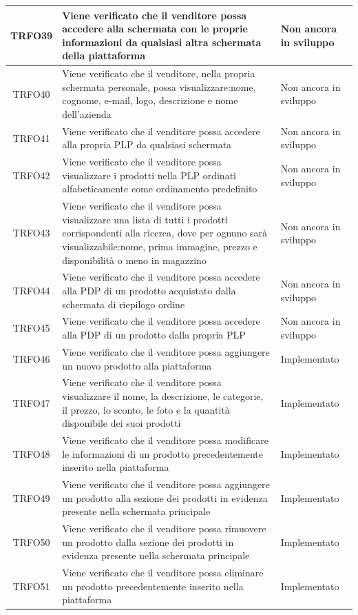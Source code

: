 \begin{longtable}{|c| C{10cm} |C{3cm}|}
	TRFO39 & Viene verificato che il venditore possa accedere alla schermata con le proprie informazioni da qualsiasi altra schermata della piattaforma & Non ancora in sviluppo\\ \hline
	TRFO40 & Viene verificato che il venditore, nella propria schermata personale, possa visualizzare:nome, cognome, e-mail, logo, descrizione e nome dell'azienda & Non ancora in sviluppo\\ \hline
	TRFO41 & Viene verificato che il venditore possa accedere alla propria PLP da qualsiasi schermata & Non ancora in sviluppo\\ \hline
	TRFO42 & Viene verificato che il venditore possa visualizzare i prodotti nella PLP ordinati alfabeticamente come ordinamento predefinito & Non ancora in sviluppo\\ \hline
	TRFO43 & Viene verificato che il venditore possa visualizzare una lista di tutti i prodotti corrispondenti alla ricerca, dove per ognuno sarà visualizzabile:nome, prima immagine, prezzo e disponibilità o meno in magazzino & Non ancora in sviluppo\\ \hline
	TRFO44 & Viene verificato che il venditore possa accedere alla PDP di un prodotto acquistato dalla schermata di riepilogo ordine & Non ancora in sviluppo\\ \hline
	TRFO45 & Viene verificato che il venditore possa accedere alla PDP di un prodotto dalla propria PLP & Non ancora in sviluppo\\ \hline
	TRFO46 & Viene verificato che il venditore possa aggiungere un nuovo prodotto alla piattaforma & Implementato\\ \hline
	TRFO47 & Viene verificato che il venditore possa visualizzare il nome, la descrizione, le categorie, il prezzo, lo sconto, le foto e la quantità disponibile dei suoi prodotti & Implementato\\ \hline
	TRFO48 & Viene verificato che il venditore possa modificare le informazioni di un prodotto precedentemente inserito nella piattaforma & Implementato\\ \hline
	TRFO49 & Viene verificato che il venditore possa aggiungere un prodotto alla sezione dei prodotti in evidenza presente nella schermata principale & Implementato\\ \hline
	TRFO50 & Viene verificato che il venditore possa rimuovere un prodotto dalla sezione dei prodotti in evidenza  presente nella schermata principale & Implementato\\ \hline
	TRFO51 & Viene verificato che il venditore possa eliminare un prodotto precedentemente inserito nella piattaforma & Implementato\\ \hline

\end{longtable}
